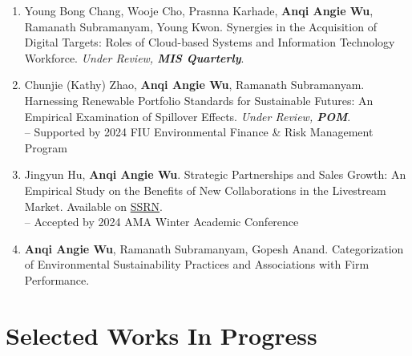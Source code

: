 \documentclass[margin,line]{resume}
\begin{document}
\begin{resume}
\begin{enumerate}[topsep=0pt, leftmargin=*]
       \item Young Bong Chang, Wooje Cho, Prasnna Karhade, \textbf{Anqi Angie Wu}, Ramanath Subramanyam, Young Kwon. Synergies in the Acquisition of Digital Targets: Roles of Cloud-based Systems and Information Technology Workforce. \textit{Under Review, \textbf{MIS Quarterly}}.\\[-0.5em]

           \item Chunjie (Kathy) Zhao, \textbf{Anqi Angie Wu}, Ramanath Subramanyam. Harnessing Renewable Portfolio Standards for Sustainable Futures: An Empirical Examination of Spillover Effects. \textit{Under Review, \textbf{POM}}.\\[0.3em]
           -- Supported by 2024 FIU Environmental Finance \& Risk Management Program\\[-0.5em]
           
           \item Jingyun Hu, \textbf{Anqi Angie Wu}. Strategic Partnerships and Sales Growth: An Empirical Study on the Benefits of New Collaborations in the Livestream Market. Available on \href{https://papers.ssrn.com/abstract=4656779}{{SSRN}}. \\[0.3em]
       -- Accepted by 2024 AMA Winter Academic Conference\\[-0.5em]

 \item \textbf{Anqi Angie Wu}, Ramanath Subramanyam, Gopesh Anand. 
       Categorization of Environmental Sustainability Practices and Associations with Firm Performance. 
        
       
\end{enumerate}   
  
 	  \section{\mysidestyle Selected Works In Progress} 
 	  \begin{enumerate}[topsep=0pt, leftmargin=*]
         


\end{enumerate}
\end{resume}
\end{document}

